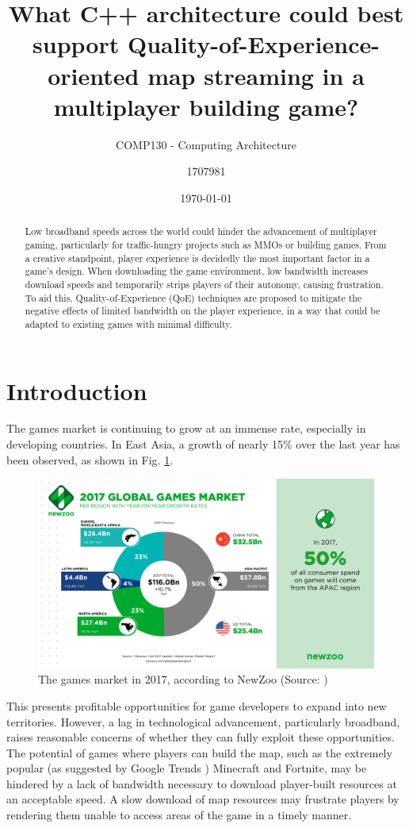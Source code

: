 \documentclass{scrartcl}
\title{What C++ architecture could best support Quality-of-Experience-oriented map streaming in a multiplayer building game?}
\subtitle{COMP130 - Computing Architecture}
\date{\today}
\author{1707981}
\begin{document}
\maketitle
{}

\begin{abstract}
Low broadband speeds across the world could hinder the advancement of multiplayer gaming, particularly for traffic-hungry projects such as MMOs or building games. From a creative standpoint, player experience is decidedly the most important factor in a game's design. When downloading the game environment, low bandwidth increases download speeds and temporarily strips players of their autonomy, causing frustration. To aid this, Quality-of-Experience (QoE) techniques are proposed to mitigate the negative effects of limited bandwidth on the player experience, in a way that could be adapted to existing games with minimal difficulty.
\end{abstract}

\section{Introduction}
The games market is continuing to grow at an immense rate, especially in developing countries. In East Asia, a growth of nearly 15\% over the last year has been observed, as shown in Fig. \ref{fig:market}.

\begin{figure}[H]
	\centering
	\includegraphics[width=0.75\linewidth]{Newzoo_2017_Global_Games_Market.png}
	\caption{The games market in 2017, according to NewZoo (Source: \cite{globalmarketpic})}
	\label{fig:market}
\end{figure}

This presents profitable opportunities for game developers to expand into new territories. However, a lag in technological advancement, particularly broadband, raises reasonable concerns of whether they can fully exploit these opportunities. The potential of games where players can build the map, such as the extremely popular (as suggested by Google Trends \cite{minecraftnite}) Minecraft and Fortnite, may be hindered by a lack of bandwidth necessary to download player-built resources at an acceptable speed. A slow download of map resources may frustrate players by rendering them unable to access areas of the game in a timely manner.
\end{document}
